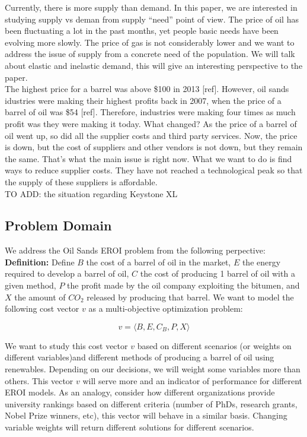 \documentclass[12pt]{article}
\begin{document}
Currently, there is more supply than demand. In this paper, we are interested in studying supply vs deman from supply ``need'' point of view. The price of oil has been fluctuating a lot in the past months, yet people basic needs have been evolving more slowly. The price of gas is not considerably lower and we want to address the issue of  supply from a concrete need of the population. We will talk about elastic and inelastic demand, this will give an interesting perspective to the paper. \\

The highest price for a barrel was above \$100 in 2013 [ref]. However, oil sands idustries were making their highest profits back in 2007, when the price of a barrel of oil was \$54 [ref]. Therefore, industries were making four times as much profit was they were making it today. What changed? As the price of a barrel of oil went up, so did all the supplier costs and third party services. Now, the price is down, but the cost of suppliers and other vendors is not down, but they remain the same. That's what the main issue is right now. What we want to do is find ways to reduce supplier costs. They have not reached a technological peak so that the supply of these suppliers is affordable.  \\

TO ADD: the situation regarding Keystone XL

\subsection{Problem Domain}

We address the Oil Sands EROI problem from the following perpective: \\

{\bf Definition:} Define $B$ the cost of a barrel of oil in the market, $E$ the energy required to develop a barrel of oil, $C$ the cost of producing 1 barrel of oil with a given method, $P$ the profit made by the oil company exploiting the bitumen, and $X$ the amount of $CO_2$ released by producing that barrel. We want to model the following cost vector $v$ as a multi-objective optimization problem:

\begin{displaymath}
v = \langle B, E, C_B, P, X \rangle
\end{displaymath}

We want to study this cost vector $v$ based on different scenarios (or weights on different variables)and different methods of producing a barrel of oil using renewables. Depending on our decisions, we will weight some variables more than others. This vector $v$ will serve more and an indicator of performance for different EROI models. As an analogy, consider how different organizations provide university rankings based on different criteria (number of PhDs, research grants, Nobel Prize winners, etc), this vector will behave in a similar basis.  Changing variable weights will return different solutions for different scenarios. \\
\end{document}
